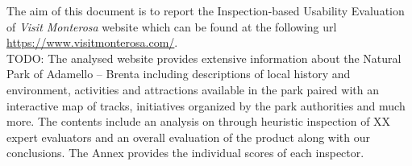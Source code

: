 The aim of this document is to report the Inspection-based Usability Evaluation of \emph{Visit Monterosa} website which can be found at the following url \url{https://www.visitmonterosa.com/}. \\ TODO: The analysed website provides extensive
information about the Natural Park of Adamello – Brenta including descriptions of local history
and environment, activities and attractions available in the park paired with an interactive map of
tracks, initiatives organized by the park authorities and much more. The contents include an
analysis on through heuristic inspection of XX expert evaluators and an overall evaluation of the
product along with our conclusions. The Annex provides the individual scores of each inspector.